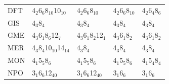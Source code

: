 \documentclass[11pt]{article}
\begin{document}
\begin{table}[htbp]
\begin{tabular}{lllll}
DFT & 4\(_{\text{2}}\)\textbullet{}6\(_{\text{6}}\)\textbullet{}8\(_{\text{10}}\)\textbullet{}10\(_{\text{10}}\) & 4\(_{\text{2}}\)\textbullet{}6\(_{\text{6}}\)\textbullet{}8\(_{\text{10}}\) & 4\(_{\text{2}}\)\textbullet{}6\(_{\text{6}}\)\textbullet{}8\(_{\text{10}}\) & 4\(_{\text{2}}\)\textbullet{}6\(_{\text{4}}\)\textbullet{}8\(_{\text{6}}\)\\
GIS & 4\(_{\text{3}}\)\textbullet{}8\(_{\text{4}}\) & 4\(_{\text{3}}\)\textbullet{}8\(_{\text{4}}\) & 4\(_{\text{3}}\)\textbullet{}8\(_{\text{4}}\) & 4\(_{\text{3}}\)\textbullet{}8\(_{\text{4}}\)\\
GME & 4\(_{\text{3}}\)\textbullet{}6\(_{\text{1}}\)\textbullet{}8\(_{\text{6}}\)\textbullet{}12\(_{\text{7}}\) & 4\(_{\text{3}}\)\textbullet{}6\(_{\text{1}}\)\textbullet{}8\(_{\text{2}}\)\textbullet{}12\(_{\text{1}}\) & 4\(_{\text{3}}\)\textbullet{}6\(_{\text{1}}\)\textbullet{}8\(_{\text{2}}\) & 4\(_{\text{3}}\)\textbullet{}6\(_{\text{1}}\)\textbullet{}8\(_{\text{2}}\)\\
MER & 4\(_{\text{3}}\)\textbullet{}8\(_{\text{4}}\)\textbullet{}10\(_{\text{10}}\)\textbullet{}14\(_{\text{14}}\) & 4\(_{\text{3}}\)\textbullet{}8\(_{\text{4}}\) & 4\(_{\text{3}}\)\textbullet{}8\(_{\text{4}}\) & 4\(_{\text{3}}\)\textbullet{}8\(_{\text{4}}\)\\
MON & 4\(_{\text{1}}\)\textbullet{}5\(_{\text{5}}\)\textbullet{}8\(_{\text{6}}\) & 4\(_{\text{1}}\)\textbullet{}5\(_{\text{5}}\)\textbullet{}8\(_{\text{6}}\) & 4\(_{\text{1}}\)\textbullet{}5\(_{\text{5}}\)\textbullet{}8\(_{\text{6}}\) & 4\(_{\text{1}}\)\textbullet{}5\(_{\text{4}}\)\textbullet{}8\(_{\text{4}}\)\\
NPO & 3\(_{\text{1}}\)\textbullet{}6\(_{\text{6}}\)\textbullet{}12\(_{\text{40}}\) & 3\(_{\text{1}}\)\textbullet{}6\(_{\text{6}}\)\textbullet{}12\(_{\text{40}}\) & 3\(_{\text{1}}\)\textbullet{}6\(_{\text{6}}\) & 3\(_{\text{1}}\)\textbullet{}6\(_{\text{6}}\)\\
\end{tabular}
\end{table}
\end{document}
